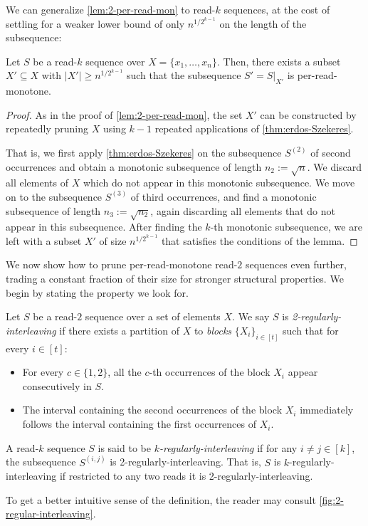 \documentclass[11pt]{article}
\begin{document}
We can generalize \autoref{lem:2-per-read-mon} to read-$k$ sequences, at the cost of settling for a weaker lower bound of only $n^{1/2^{k-1}}$ on the length of the subsequence:

\begin{lemma}
\label{lem:k-per-read-mon}
Let $S$ be a read-$k$ sequence over $X=\{x_1, \ldots, x_n\}$. Then, there exists a subset $X' \subseteq X$ with $|X'| \ge n^{1/2^{k-1}} $ such that the subsequence $S'=S|_{X'}$ is per-read-monotone.
\end{lemma}
\begin{proof}
As in the proof of \autoref{lem:2-per-read-mon}, the set $X'$ can be constructed by repeatedly pruning $X$ using $k-1$ repeated applications of \autoref{thm:erdos-Szekeres}.

That is, we first apply \autoref{thm:erdos-Szekeres} on the subsequence $S^{(2)}$ of second occurrences and obtain a monotonic subsequence of length $n_2 := \sqrt{n}$. We discard all elements of $X$ which do not appear in this monotonic subsequence. We move on to the subsequence $S^{(3)}$ of third occurrences, and find a monotonic subsequence of length $n_3 := \sqrt{n_2}$, again discarding all elements that do not appear in this subsequence. After finding the $k$-th monotonic subsequence, we are left with a subset $X'$ of size $n^{1/2^{k-1}}$ that satisfies the conditions of the lemma.
\end{proof}

We now show how to prune per-read-monotone read-$2$ sequences even further, trading a constant fraction of their size for stronger structural properties. We begin by stating the property we look for.

\begin{definition}
\label{def:regularly-interleaving}
Let $S$ be a read-$2$ sequence over a set of elements $X$. We say $S$ is {\em 2-regularly-interleaving} if there exists a partition of $X$ to {\em blocks} $\{X_i\}_{i \in [t]}$ such that for every $i \in [t]$:
\begin{itemize}
\item For every $c \in \{1,2\}$, all the $c$-th occurrences of the block $X_i$ appear consecutively in $S$.
\item The interval containing the second occurrences of the block $X_i$ immediately follows the interval containing the first occurrences of $X_{i}$. 
\end{itemize}
A read-$k$ sequence $S$ is said to be {\em $k$-regularly-interleaving} if for any $i \neq j \in [k]$, the subsequence $S^{(i,j)}$ is 2-regularly-interleaving. That is, $S$ is $k$-regularly-interleaving if restricted to any two reads it is 2-regularly-interleaving.
\end{definition}
To get a better intuitive sense of the definition, the reader may consult \autoref{fig:2-regular-interleaving}.
\end{document}
